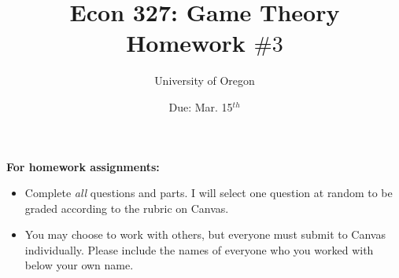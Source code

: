 \documentclass[addpoints ]{exam}
\title{
    \textbf{Econ 327: Game Theory} \\ 
    Homework $\#3$
    }
\author{University of Oregon}
\date{Due: Mar. 15$^{th}$}
\begin{document}
\maketitle

\begin{center}
  \gradetable[h][questions]
\end{center}

\vspace{0.5in}

\begin{center}
  \textbf{For homework assignments:}
\end{center}

\begin{itemize}


  \item Complete \textit{all} questions and parts.
  I will select one question at random to be graded
  according to the rubric on Canvas.

  \item You may choose to work with others,
  but everyone must submit to Canvas individually.
  Please include the names of everyone who you worked with 
  below your own name.
 
\end{itemize}

\vspace{1.0in}


\vspace{0.5in}

\newpage
\end{document}
